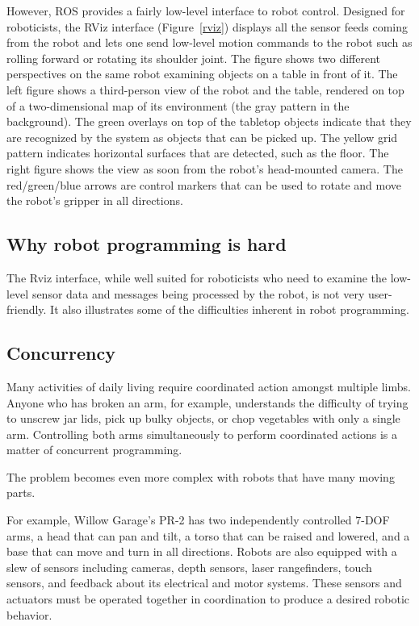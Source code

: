 \documentclass[10pt,twocolumn]{article}
\begin{document}
However, ROS provides a fairly low-level interface to robot control. Designed for roboticists, the RViz interface (Figure~\ref{rviz}) displays all the sensor feeds coming from the robot and lets one send low-level motion commands to the robot such as rolling forward or rotating its shoulder joint. The figure shows two different perspectives on the same robot examining objects on a table in front of it. The left figure shows a third-person view of the robot and the table, rendered on top of a two-dimensional map of its environment (the gray pattern in the background). The green overlays on top of the tabletop objects indicate that they are recognized by the system as objects that can be picked up. The yellow grid pattern indicates horizontal surfaces that are detected, such as the floor.  The right figure shows the view as soon from the robot's head-mounted camera. The red/green/blue arrows are control markers that can be used to rotate and move the robot's gripper in all directions.

\begin{changebar}
\section{Why robot programming is hard}
\end{changebar}

The Rviz interface, while well suited for roboticists who need to examine the low-level sensor data and messages being processed by the robot, is not very user-friendly. It also illustrates some of the difficulties inherent in robot programming.

\subsection{Concurrency}


\begin{changebar}
Many activities of daily living require coordinated action amongst multiple limbs. Anyone who has broken an arm, for example, understands the difficulty of trying to unscrew jar lids, pick up bulky objects, or chop vegetables with only a single arm. Controlling both arms simultaneously to perform coordinated actions is a matter of concurrent programming.

The problem becomes even more complex with robots that have many moving parts.
\end{changebar}
For example, Willow Garage's PR-2 has two independently controlled 7-DOF arms, a head that can pan and tilt, a torso that can be raised and lowered, and a base that can move and turn in all directions. Robots are also equipped with a slew of sensors including cameras, depth sensors, laser rangefinders, touch sensors, and feedback about its electrical and motor systems. These sensors and actuators must be operated together in coordination to produce a desired robotic behavior.
\end{document}
